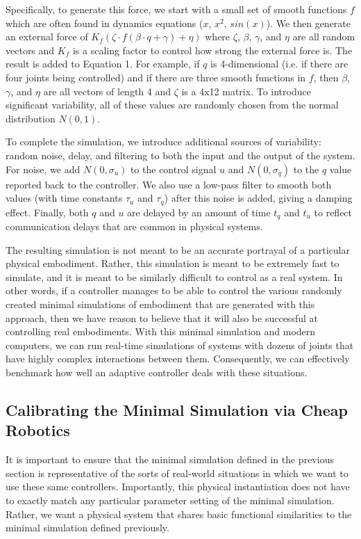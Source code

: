 \documentclass{frontiersSCNS} %
\begin{document}
Specifically, to generate this force, we start with a small set of
smooth functions $f$ which are often found in dynamics equations ($x$, $x^2$,
$sin(x)$).  We then generate an external force of $K_f (\zeta \cdot f(\beta \cdot q + \gamma) + \eta)$
where $\zeta$, $\beta$, $\gamma$, and $\eta$ are all random vectors and
$K_f$ is a scaling factor to control how strong the external force is.  The
result is added to Equation 1.  For example, if $q$ is 4-dimensional
(i.e. if there are four joints being controlled) and if there are three smooth
functions in $f$, then $\beta$, $\gamma$, and $\eta$ are 
all vectors of length 4 and $\zeta$ is a 4x12 matrix.  To introduce
significant variability, all of these values are
randomly chosen from the normal distribution $N(0,1)$.

To complete the simulation, we introduce additional sources of variability: random noise, delay, and filtering to both the input and the
output of the system.  For noise, we add $N(0,\sigma_u)$ to the control signal
$u$ and $N(0,\sigma_q)$ to the $q$ value reported back to the controller.  We
also use a low-pass filter to smooth both values (with time constants $\tau_u$
and $\tau_q$) after this noise is added, giving a damping effect.  Finally, both $q$ and $u$ are delayed
by an amount of time $t_q$ and $t_u$ to reflect communication delays that are
common in physical systems.

The resulting simulation is not meant to be an accurate portrayal of a particular physical embodiment.
Rather, this simulation is meant to be extremely fast
to simulate, and it is meant to be similarly difficult to control as a real system.
In other words, if a controller manages to be able to control
the various randomly created minimal simulations of embodiment that are
generated with this approach, then we have reason to believe that it will also
be successful at controlling real embodiments.  With this minimal simulation and
modern computers, we can run real-time simulations of systems with dozens of joints that have
highly complex interactions between them.  Consequently, we can effectively
benchmark how well an adaptive
controller deals with these situations.

\subsection{Calibrating the Minimal Simulation via Cheap Robotics}

It is important to ensure that the minimal simulation defined
in the previous section is representative of the sorts of real-world
situations in which we want to use these same controllers.  Importantly, 
this physical instantiation does not have to exactly match any particular
parameter setting of the minimal simulation.  Rather, we want a physical system
that shares basic functional similarities to the minimal simulation defined
previously.
\end{document}
